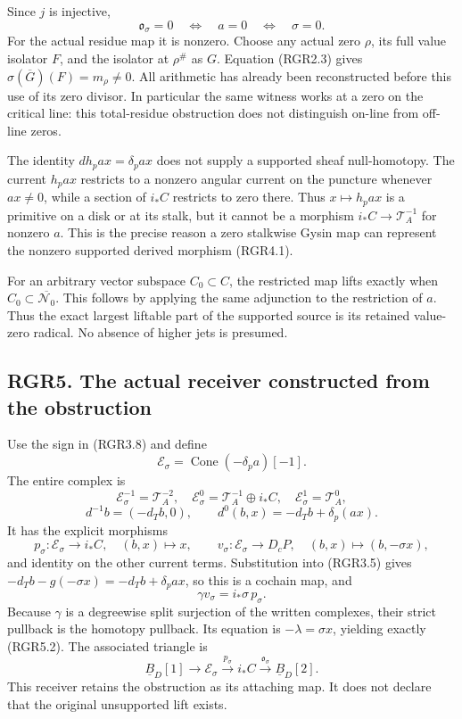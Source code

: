 Since \(j\) is injective, \[
 \mathfrak o_\sigma=0\quad\Longleftrightarrow\quad a=0
 \quad\Longleftrightarrow\quad\sigma=0.
 \tag{RGR4.3}
\] For the actual residue map it is nonzero. Choose any actual zero
\(\rho\), its full value isolator \(F\), and the isolator at \(\rho^\#\)
as \(G\). Equation (RGR2.3) gives \(\sigma(\overline G)(F)=m_\rho\ne0\).
All arithmetic has already been reconstructed before this use of its
zero divisor. In particular the same witness works at a zero on the
critical line: this total-residue obstruction does not distinguish
on-line from off-line zeros.

The identity \(dh_p a x=\delta_pa x\) does not supply a supported sheaf
null-homotopy. The current \(h_pa x\) restricts to a nonzero angular
current on the puncture whenever \(a x\ne0\), while a section of
\(i_*C\) restricts to zero there. Thus \(x\mapsto h_pa x\) is a
primitive on a disk or at its stalk, but it cannot be a morphism
\(i_*C\to\mathscr T_A^{-1}\) for nonzero \(a\). This is the precise
reason a zero stalkwise Gysin map can represent the nonzero supported
derived morphism (RGR4.1).

For an arbitrary vector subspace \(C_0\subset C\), the restricted map
lifts exactly when \(C_0\subset\overline{\mathcal N_0}\). This follows
by applying the same adjunction to the restriction of \(a\). Thus the
exact largest liftable part of the supported source is its retained
value-zero radical. No absence of higher jets is presumed.

\subsection{RGR5. The actual receiver constructed from the
obstruction}\label{rgr5.-the-actual-receiver-constructed-from-the-obstruction}

Use the sign in (RGR3.8) and define \[
 \mathscr E_\sigma=\operatorname{Cone}(-\delta_p a)[-1].
 \tag{RGR5.1}
\] The entire complex is \[
 \mathscr E_\sigma^{-1}=\mathscr T_A^{-2},\quad
 \mathscr E_\sigma^0=\mathscr T_A^{-1}\oplus i_*C,\quad
 \mathscr E_\sigma^1=\mathscr T_A^0,
\] \[
 d^{-1}b=(-d_Tb,0),\qquad d^0(b,x)=-d_Tb+\delta_p(a x).
 \tag{RGR5.2}
\] It has the explicit morphisms \[
 p_\sigma:\mathscr E_\sigma\longrightarrow i_*C,\quad (b,x)\mapsto x,
\qquad
 v_\sigma:\mathscr E_\sigma\longrightarrow D_cP,\quad
 (b,x)\mapsto(b,-\sigma x),
 \tag{RGR5.3}
\] and identity on the other current terms. Substitution into (RGR3.5)
gives \(-d_Tb-g(-\sigma x)=-d_Tb+\delta_p a x\), so this is a cochain
map, and \[
 \gamma v_\sigma=i_*\sigma\,p_\sigma.
 \tag{RGR5.4}
\] Because \(\gamma\) is a degreewise split surjection of the written
complexes, their strict pullback is the homotopy pullback. Its equation
is \(-\lambda=\sigma x\), yielding exactly (RGR5.2). The associated
triangle is \[
 \underline B_D[1]\longrightarrow\mathscr E_\sigma
 \xrightarrow{p_\sigma}i_*C
 \xrightarrow{\mathfrak o_\sigma}\underline B_D[2].
 \tag{RGR5.5}
\] This receiver retains the obstruction as its attaching map. It does
not declare that the original unsupported lift exists.

